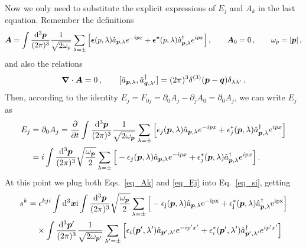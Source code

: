 \begin{sol}
\begin{equation}
    \end{equation}
    Now we only need to substitute the explicit expressions of $E_{j}$ and $A_{k}$ in the last equation. Remember the definitions
    \begin{equation}
    \label{eq_Ak}
        \boldsymbol{A} = \int \frac{\rm{\rm d}^3\boldsymbol{p}}{(2\pi)^{3}}\frac{1}{\sqrt{2\omega_{p}}}\sum_{\lambda=\pm}\Big[\boldsymbol{\epsilon}(p, \lambda)\hat{a}_{\boldsymbol{p}, \lambda}e^{-ipx} + \boldsymbol{\epsilon^{*}}(p, \lambda)\hat{a}^\dagger_{\boldsymbol{p}, \lambda}e^{ipx} \Big] \,,
        \qquad
        \boldsymbol{A}_{0} = 0 \,,
        \qquad
        \omega_{p} = |\boldsymbol{p}|\, ,
    \end{equation}
    and also the relations 
    \begin{equation}
        \boldsymbol{\nabla} \cdot \boldsymbol{A} = 0 \,,
        \qquad
        [\hat{a}_{\boldsymbol{p},\lambda}, \hat{a}^\dagger_{\boldsymbol{q}, \lambda'}] = (2\pi)^{3}\delta^{(3)}(\boldsymbol{p}-\boldsymbol{q})\delta_{\lambda \lambda'}\, .
    \end{equation}
    Then, according to the identity $E_{j} = F_{0j} = \partial_{0}A_{j} - \partial_{j}A_{0} = \partial_{0}A_{j}$, we can write $E_j$ as
    \begin{equation}
    \label{eq_Ej}
        \begin{split}
            E_{j} &= \partial_{0}A_{j} = \frac{\partial}{\partial t} \int \frac{\rm{\rm d}^3\boldsymbol{p}}{(2\pi)^{3}}\frac{1}{\sqrt{2\omega_{\boldsymbol{p}}}}\sum_{\lambda=\pm}\Big[\epsilon_{j}(\boldsymbol{p}, \lambda)\hat{a}_{\boldsymbol{p}, \lambda}e^{-ipx} + \epsilon^*_{j}(\boldsymbol{p}, \lambda)\hat{a}^\dagger_{\boldsymbol{p}, \lambda}e^{ipx} \Big] \\
            &= i\int \frac{\rm{\rm d}^3\boldsymbol{p}}{(2\pi)^{3}}\sqrt{\frac{\omega_{\boldsymbol{p}}}{2}}\sum_{\lambda=\pm}\Big[-\epsilon_{j}(\boldsymbol{p}, \lambda)\hat{a}_{\boldsymbol{p}, \lambda}e^{-ipx} + \epsilon^*_{j}(\boldsymbol{p}, \lambda)\hat{a}^\dagger_{\boldsymbol{p}, \lambda}e^{ipx} \Big]\,.
        \end{split}
    \end{equation}
    At this point we plug both Eqs.~\eqref{eq_Ak} and \eqref{eq_Ej} into Eq.~\eqref{eq_si}, getting
    \begin{equation}
    \label{eq_semifinalsk}
    \begin{split}
            s^{k} = &\; \epsilon^{kji} \int \rm\rmd^3\vx i \int \frac{\rm\rmd^3\vp}{(2\pi)^{3}}\sqrt{\frac{\omega_{\vp}}{2}}\sum_{\lambda=\pm}\Big[-\epsilon_{j}(\vp, \lambda)\ades_{\vp, \lambda}e^{-ipx} + \epsilon^*_{j}(\vp, \lambda)\acon_{\vp, \lambda}e^{ipx} \Big] \\
            &\times \int \frac{\rm\rmd^3\vp'}{(2\pi)^{3}}\frac{1}{\sqrt{2\omega_{\vp'}}}\sum_{\lambda'=\pm}\Big[\epsilon_{i}(\vp', \lambda')\ades_{\vp', \lambda'}e^{-ip'x'} + \epsilon^*_{i}(\vp', \lambda')\acon_{\vp', \lambda'}e^{ip'x'} \Big] \\

\end{split}
\end{equation}
\end{sol}
